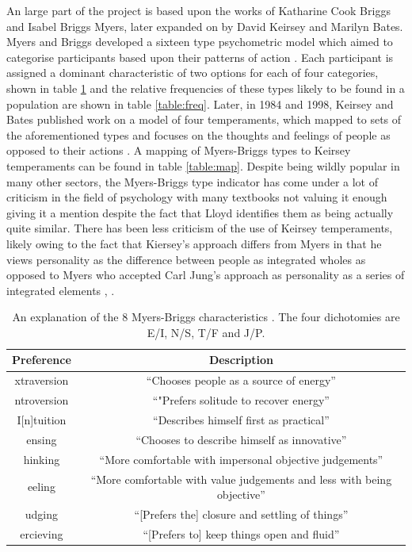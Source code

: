 \documentclass[12pt]{article}
\begin{document}
An large part of the project is based upon the works of Katharine Cook Briggs and Isabel Briggs Myers, later expanded on by David Keirsey and Marilyn Bates. Myers and Briggs developed a sixteen type psychometric model which aimed to categorise participants based upon their patterns of action \cite{myers1995gifts}. Each participant is assigned a dominant characteristic of two options for each of four categories, shown in table \ref{table:type} and the relative frequencies of these types likely to be found in a population are shown in table \ref{table:freq}. Later, in 1984 and 1998, Keirsey and Bates published work on a model of four temperaments, which mapped to sets of the aforementioned types and focuses on the thoughts and feelings of people as opposed to their actions \cite{keirsey1984} \cite{keirsey1998please}. A mapping of Myers-Briggs types to Keirsey temperaments can be found in table \ref{table:map}. Despite being wildly popular in many other sectors, the Myers-Briggs type indicator has come under a lot of criticism in the field of psychology with many textbooks not valuing it enough giving it a mention \cite{lloyd2012myers} despite the fact that Lloyd identifies them as being actually quite similar. There has been less criticism of the use of Keirsey temperaments, likely owing to the fact that Kiersey's approach differs from Myers in that he views personality as the difference between people as integrated wholes as opposed to Myers who accepted Carl Jung's approach as personality as a series of integrated elements \cite{jung1923psychological}, \cite{keirsey1998please}.

\begin{table}[p]
	\begin{center}
	\begin{tabular}{|c|c|}
		\hline Preference & Description \\ 
		\hline [E]xtraversion & ``Chooses people as a source of energy'' \\ 
		\hline [I]ntroversion & ``"Prefers solitude to recover energy'' \\ 
		\hline I[n]tuition & ``Describes himself first as practical'' \\ 
		\hline [S]ensing & ``Chooses to describe himself as innovative'' \\ 
		\hline [T]hinking & ``More comfortable with impersonal objective judgements'' \\ 
		\hline [F]eeling & ``More comfortable with value judgements and less with being objective'' \\ 
		\hline [J]udging & ``[Prefers the] closure and settling of things'' \\ 
		\hline [P]ercieving & ``[Prefers to] keep things open and fluid'' \\ 
		\hline 
	\end{tabular}
	\end{center}
	\caption{An explanation of the 8 Myers-Briggs characteristics \cite{myers1995gifts}. The four dichotomies are E/I, N/S, T/F and J/P.}
	\label{table:type}
\end{table}
\end{document}
